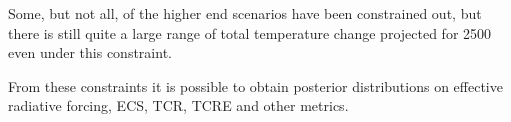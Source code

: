 \documentclass[letterpaper,10pt,english]{sphinxmanual}
\begin{document}
\noindent{}

Some, but not all, of the higher end scenarios have been constrained
out, but there is still quite a large range of total temperature change
projected for 2500 even under this constraint.

From these constraints it is possible to obtain posterior distributions
on effective radiative forcing, ECS, TCR, TCRE and other metrics.



\renewcommand{\indexname}{Index}
\printindex
\end{document}

